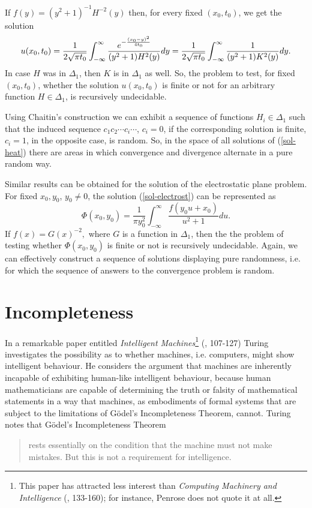         If  $f(y) = (y^2+1)^{-1}H^{-2}(y)$  then, for every fixed
$(x_0,t_0)$, we get the solution
         \[ u(x_0,t_0) = \frac{1}{2\sqrt{\pi t_0}}\int_{-\infty}^{\infty}
\frac{e^{-\frac{(x_0-y)^2}{4t_0}}}{(y^2+1)H^2(y)}dy =\\
 \frac{1}{2\sqrt{\pi t_0}}\int_{-\infty}^{\infty}
\frac{1}{(y^2+1)K^2(y)}dy.\]
In case $H$ was in $\Delta_1$, then $  K$ is in $\Delta_1$ as well. So, the
problem
to test, for fixed $(x_0,t_0)$,   whether
 the solution $u(x_0,t_0)$ is finite or not for an arbitrary function
$H\in\Delta_1$,
is recursively undecidable.



Using Chaitin's construction we can exhibit a
sequence of functions  $H_i\in\Delta_1$ such that the induced sequence
$c_1c_2\cdots c_i\cdots$, $c_i = 0$, if the corresponding solution is finite,
$c_i = 1$,  in the opposite case, is random. So, in the space of all solutions
of (\ref{sol-heat}) there are areas in which convergence and divergence
alternate
in a pure random way.




        Similar results can be obtained for the solution of the electrostatic
plane problem.
For fixed $x_0,y_0$, $y_0\ne 0$, the solution
(\ref{sol-electrost}) can  be represented as
\begin{equation}\label{undec-sol}
        \displaystyle \Phi(x_0,y_0) = \frac{1}{\pi y_0^2}\int_{-\infty}^{\infty}
\frac{f(y_0u+x_0)}{u^2+1} du.       \end{equation}
        If $f(x) = G(x)^{-2},$
where $ G$ is a function in $\Delta_1$,
then  the the problem of testing whether $\Phi(x_0,y_0)$  is finite or not
is recursively undecidable. Again,  we can effectively construct
a sequence of solutions displaying pure randomness, i.e. for which
the sequence of answers to the convergence problem is random.






\section{Incompleteness}

In a remarkable  paper entitled {\it Intelligent
Machines}\footnote{This paper has attracted less interest than {\it
Computing Machinery and
Intelligence} (\cite{tu2}, 133-160); for instance, Penrose does not quote
it at all.}
 (\cite{tu2}, 107-127)
Turing investigates the possibility as to whether machines, i.e. computers,
might
show intelligent
behaviour.
He considers the argument that machines are inherently incapable of exhibiting
human-like intelligent behaviour, because human mathematicians are capable
of determining the truth or falsity of mathematical statements in a way
that machines, as embodiments of formal systems that are subject to the
limitations of G\" odel's Incompleteness Theorem, cannot.
Turing notes that G\" odel's Incompleteness Theorem
\begin{quote}
 rests  essentially on the condition
that   the machine  must not make  mistakes.
But this is not a requirement
for intelligence.
\end{quote}

